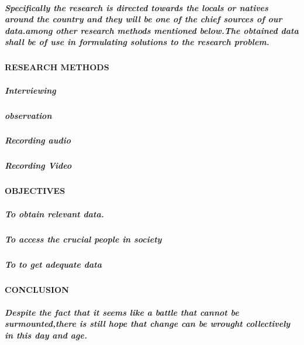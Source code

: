 \documentclass[10pt]{article}
\begin{document}
\subparagraph{Specifically the research is directed towards the locals or natives around the country and they will be one of the chief sources of our data.among other research methods mentioned below.The obtained data shall be of use in formulating solutions to the research problem.}
\paragraph{RESEARCH METHODS}
\subparagraph{Interviewing }
\subparagraph{observation}
\subparagraph{Recording audio}
\subparagraph{Recording Video}


\paragraph{OBJECTIVES}
\subparagraph{To obtain relevant data. }
\subparagraph{To access the crucial people in society }
\subparagraph{To to get adequate data}


\paragraph{CONCLUSION}
\subparagraph{Despite the fact that it seems like a battle that cannot be surmounted,there is still hope that change can be wrought collectively in this day and age. }
\end{document}
